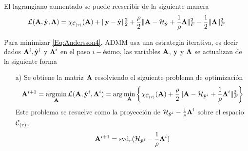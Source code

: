 	El lagrangiano aumentado se puede reescribir de la siguiente manera
	\begin{equation}
		\mathcal{L}(\mathbf{A},\hat{\mathbf{y}},\boldsymbol{\Lambda}) = \chi_{\mathcal{C}_{(r)}}(\mathbf{A}) + \|\mathbf{y}-\hat{\mathbf{y}}\|_2^2 + \frac{\rho}{2}\|\mathbf{A}-\mathcal{H}_{\hat{\mathbf{y}}}+\frac{1}{\rho}\boldsymbol{\Lambda}\|^2_F -\frac{1}{2}\|\boldsymbol{\Lambda}\|_F^2
		\label{Eq:Andersson4} 
	\end{equation}

	Para minimizar \eqref{Eq:Andersson4}, ADMM usa una estrategia iterativa, es decir dados $\mathbf{A}^{i}, \hat{\mathbf{y}}^{i}$ y $\boldsymbol{\Lambda}^i$ en el paso $i-$ésimo, las variables $\mathbf{A}$, $\mathbf{y}$ y $\boldsymbol{\Lambda}$ se actualizan de la siguiente forma 
	\begin{itemize}
		\item[a)] Se obtiene la matriz $\mathbf{A}$ resolviendo el siguiente problema de optimización
			\begin{equation} 
				\mathbf{A}^{i+1}  = \operatorname*{\arg\!\min}_{\mathbf{A}}\mathcal{L}(\mathbf{A},\hat{\mathbf{y}}^i,\boldsymbol{\Lambda}^i) = \arg\min_{\mathbf{A}} \bigg\{\chi_{\mathcal{C}_{(r)}}(\mathbf{A}) + \frac{\rho}{2}\|\mathbf{A} - \mathcal{H}_{\hat{\mathbf{y}}^i}+\frac{1}{\rho}\boldsymbol{\Lambda}^i\|_F^2\bigg\}
				\label{Eq:Andersson5}				
			\end{equation} 
			Este problema se resuelve como la proyección de $\mathcal{H}_{\hat{\mathbf{y}}^i}-\frac{1}{\rho}\boldsymbol{\Lambda}^i$ sobre el espacio $\mathcal{C}_{(r)}$,
			\begin{equation}
				\mathbf{A}^{i+1} = \mathrm{svd}_r(\mathcal{H}_{\hat{\mathbf{y}}^i}-\frac{1}{\rho}\boldsymbol{\Lambda}^{i})
			\end{equation}
	

\end{itemize}
